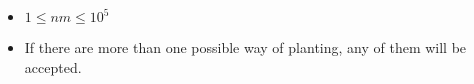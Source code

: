 \begin{itemize}
\tightlist
\item $1 \le nm \le 10^5$
\item If there are more than one possible way of planting, any of them will be 
      accepted.
\end{itemize}
\newpage

